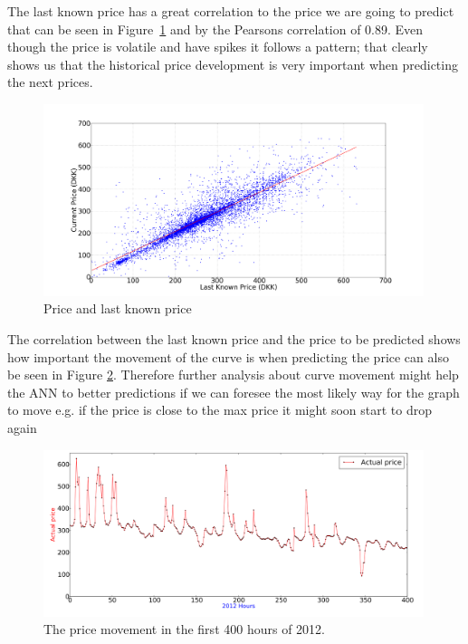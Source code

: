 The last known price has a great correlation to the price we are going to predict that can be seen in Figure~\ref{fig:price_price} and by the Pearsons correlation of 0.89. Even though the price is volatile and have spikes it follows a pattern; that clearly shows us that the historical price development is very important when predicting the next prices.

\begin{figure}[H]
\centering
\includegraphics[width=0.99\textwidth]{billeder/priceVsLastKnownPrice.png}
\caption{Price and last known price}
\label{fig:price_price}
\end{figure}

The correlation between the last known price and the price to be predicted shows how important the movement of the curve is when predicting the price can also be seen in Figure \ref{fig:priceGraphFirst400Hours}. Therefore further analysis about curve movement might help the ANN to better predictions if we can foresee the most likely way for the graph to move e.g. if the price is close to the max price it might soon start to drop again 

\begin{figure}[H]
\centering
\includegraphics[width=0.99\textwidth]{billeder/priceGraph400.png}
\caption{The price movement in the first 400 hours of 2012.}
\label{fig:priceGraphFirst400Hours}
\end{figure}

